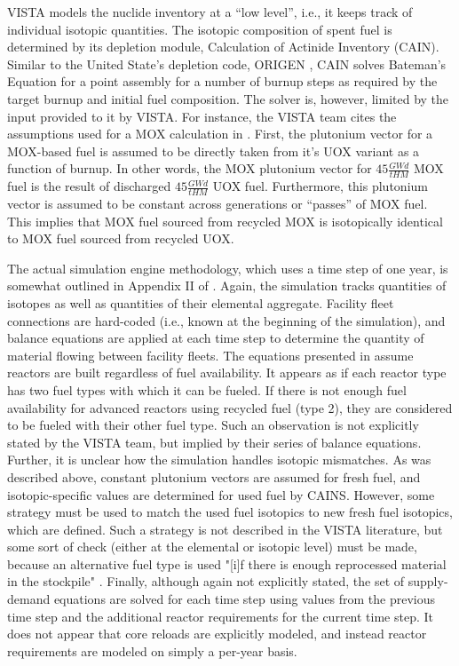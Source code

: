 VISTA models the nuclide inventory at a ``low level'', i.e., it keeps track of
individual isotopic quantities. The isotopic composition of spent fuel is
determined by its depletion module, Calculation of Actinide Inventory
(CAIN). Similar to the United State's depletion code, ORIGEN
\cite{bell_origen_1973}, CAIN solves Bateman's Equation for a point assembly for
a number of burnup steps as required by the target burnup and initial fuel
composition. The solver is, however, limited by the input provided to it by
VISTA. For instance, the VISTA team cites the assumptions used for a MOX
calculation in \cite{iaea_nuclear_2007}. First, the plutonium vector for a
MOX-based fuel is assumed to be directly taken from it's UOX variant as a
function of burnup. In other words, the MOX plutonium vector for $45 \frac{GW
  d}{tHM}$ MOX fuel is the result of discharged $45 \frac{GW d}{tHM}$ UOX
fuel. Furthermore, this plutonium vector is assumed to be constant across
generations or ``passes'' of MOX fuel. This implies that MOX fuel sourced from
recycled MOX is isotopically identical to MOX fuel sourced from recycled UOX.

The actual simulation engine methodology, which uses a time step of one year, is
somewhat outlined in Appendix II of \cite{iaea_nuclear_2007}. Again, the
simulation tracks quantities of isotopes as well as quantities of their
elemental aggregate. Facility fleet connections are hard-coded (i.e., known at
the beginning of the simulation), and balance equations are applied at each time
step to determine the quantity of material flowing between facility fleets. The
equations presented in \cite{iaea_nuclear_2007} assume reactors are built
regardless of fuel availability. It appears as if each reactor type has two fuel
types with which it can be fueled. If there is not enough fuel availability for
advanced reactors using recycled fuel (type 2), they are considered to be fueled
with their other fuel type. Such an observation is not explicitly stated by the
VISTA team, but implied by their series of balance equations. Further, it is
unclear how the simulation handles isotopic mismatches. As was described above,
constant plutonium vectors are assumed for fresh fuel, and isotopic-specific
values are determined for used fuel by CAINS. However, some strategy must be
used to match the used fuel isotopics to new fresh fuel isotopics, which are
defined. Such a strategy is not described in the VISTA literature, but some sort
of check (either at the elemental or isotopic level) must be made, because an
alternative fuel type is used "[i]f there is enough reprocessed material in the
stockpile" \cite{iaea_nuclear_2007}. Finally, although again not explicitly
stated, the set of supply-demand equations are solved for each time step using
values from the previous time step and the additional reactor requirements for
the current time step. It does not appear that core reloads are explicitly
modeled, and instead reactor requirements are modeled on simply a per-year
basis.

